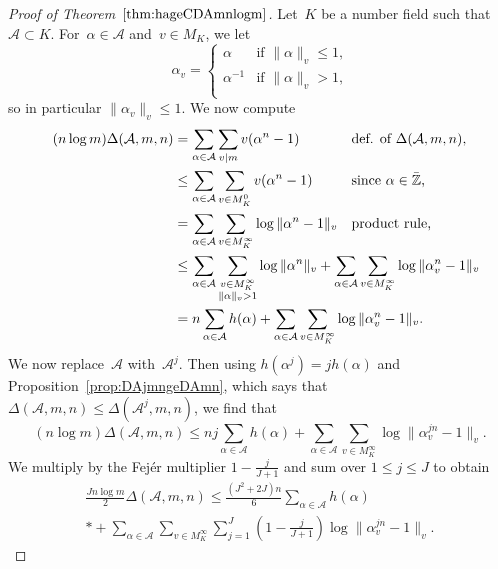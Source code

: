 \begin{proof}[Proof of Theorem~$\ref{thm:hageCDAmnlogm}$]
Let~$K$ be a number field such that ${{\mathcal A}}\subset K$.
For~${\alpha}\in{{\mathcal A}}$ and~$v\in M_K$, we let
\[
  {\alpha}_v = \begin{cases}
     {\alpha}&\text{if $\|{\alpha}\|_v\le1$,}\\
     {\alpha}^{-1}&\text{if $\|{\alpha}\|_v>1$,}\\
  \end{cases}
\]
so in particular $\|{\alpha}_v\|_v\le 1$.  We now compute
\begin{align}
  \label{eqn:nlogmDlehlogan1v}
  (n\log m){\Delta}({{\mathcal A}},m,n) 
  &= \sum_{{\alpha}\in{{\mathcal A}}}\sum_{v\mid m} v({\alpha}^n-1)
    &&\text{def. of ${\Delta}({{\mathcal A}},m,n)$,} \notag\\
  &\le \sum_{{\alpha}\in{{\mathcal A}}}\sum_{v\in M_K^0} v({\alpha}^n-1)
    &&\text{since ${\alpha}\in\bar{\mathbb{Z}}$,} \notag\\
  &= \sum_{{\alpha}\in{{\mathcal A}}}\sum_{v\in M_K^\infty} \log\|{\alpha}^n-1\|_v
    &&\text{product rule,} \notag\\
  &\le \sum_{{\alpha}\in{{\mathcal A}}}\sum_{\substack{v\in M_K^\infty\\\|{\alpha}\|_v>1\\}} \log\|{\alpha}^n\|_v
    +  \sum_{{\alpha}\in{{\mathcal A}}}\sum_{v\in M_K^\infty} \log\|{\alpha}_v^n-1\|_v \hidewidth \notag\\
  &= n\sum_{{\alpha}\in{{\mathcal A}}} h({\alpha}) 
    +  \sum_{{\alpha}\in{{\mathcal A}}}\sum_{v\in M_K^\infty} \log\|{\alpha}_v^n-1\|_v. \hidewidth 
\end{align}
We now replace~${{\mathcal A}}$ with~${{\mathcal A}}^j$. Then using $h({\alpha}^j)=jh({\alpha})$ and
Proposition~\ref{prop:DAjmngeDAmn}, which says that
${\Delta}({{\mathcal A}},m,n)\le{\Delta}({{\mathcal A}}^j,m,n)$, we find that
\[
  (n\log m){\Delta}({{\mathcal A}},m,n) 
  \le nj\sum_{{\alpha}\in{{\mathcal A}}}h({\alpha}) 
    +  \sum_{{\alpha}\in{{\mathcal A}}}\sum_{v\in M_K^\infty} \log\|{\alpha}_v^{jn}-1\|_v .
\]
We multiply by the Fej\'er multiplier $1-\frac{j}{J+1}$  and sum over
$1\le j\le J$ to obtain
\begin{multline*}
  \frac{Jn\log m}{2}{\Delta}({{\mathcal A}},m,n) 
  \le \frac{(J^2+2J)n}{6}\sum_{{\alpha}\in{{\mathcal A}}}h({\alpha})  \\*
    +  \sum_{{\alpha}\in{{\mathcal A}}}\sum_{v\in M_K^\infty} 
         \sum_{j=1}^J \left(1-\frac{j}{J+1}\right)\log\|{\alpha}_v^{jn}-1\|_v .

\end{multline*}
\end{proof}
